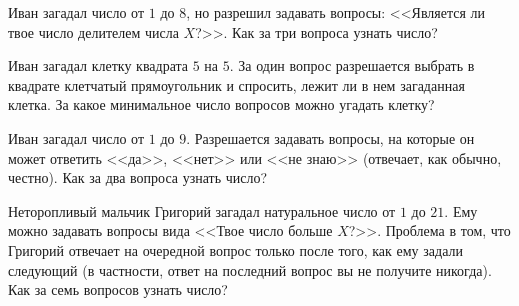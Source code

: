 \begin{problems}

\item
Иван загадал число от $1$ до $8$, но разрешил задавать вопросы:
<<Является ли твое число делителем числа $X$?>>.
Как за три вопроса узнать число?

\item
Иван загадал клетку квадрата $5$ на $5$.
За один вопрос разрешается выбрать в квадрате клетчатый прямоугольник и спросить, лежит
ли в нем загаданная клетка.
За какое минимальное число вопросов можно угадать клетку?

\item
Иван загадал число от $1$ до $9$.
Разрешается задавать вопросы, на которые он может ответить <<да>>, <<нет>> или
<<не знаю>> (отвечает, как обычно, честно).
Как за два вопроса узнать число?

\item
Неторопливый мальчик Григорий загадал натуральное число от $1$ до $21$.
Ему можно задавать вопросы вида <<Твое число больше $X$?>>.
Проблема в том, что Григорий отвечает на очередной вопрос только после того, как ему
задали следующий (в частности, ответ на последний вопрос вы не получите никогда).
Как за семь вопросов узнать число?

\end{problems}

